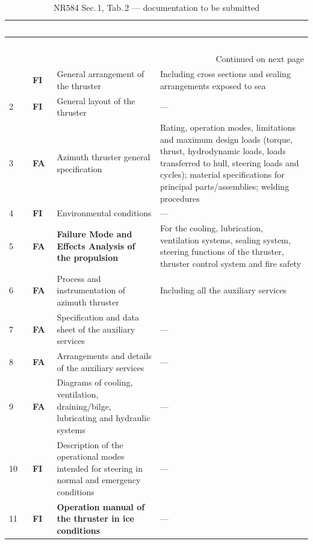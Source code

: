 \documentclass[11pt,a4paper]{report}
\newcommand{\fa}{\textbf{\textcolor{warningred}{FA}}}
\newcommand{\fic}{\textbf{\textcolor{bvgray}{FI}}}
\begin{document}
\begin{longtable}{|p{0.7cm}|p{1.1cm}|p{6.0cm}|p{6.2cm}|}
\caption{NR584 Sec.\,1, Tab.\,2 --- documentation to be submitted} \label{tab:nr584t2} \\
\hline
\rowcolor{bvblue}
\textcolor{white}{\textbf{No.}} & \textcolor{white}{\textbf{A/I}} & \textcolor{white}{\textbf{Documentation}} & \textcolor{white}{\textbf{Particulars}} \\
\hline
\endfirsthead
\hline
\rowcolor{bvblue}
\textcolor{white}{\textbf{No.}} & \textcolor{white}{\textbf{A/I}} & \textcolor{white}{\textbf{Documentation}} & \textcolor{white}{\textbf{Particulars}} \\
\hline
\endhead
\hline \multicolumn{4}{|r|}{{Continued on next page}} \\ \hline
\endfoot
\hline
\endlastfoot
1 & \fic{} & General arrangement of the thruster & Including cross sections and sealing arrangements exposed to sea \\
\hline
2 & \fic{} & General layout of the thruster & --- \\
\hline
3 & \fa{} & Azimuth thruster general specification & Rating, operation modes, limitations and maximum design loads (torque, thrust, hydrodynamic loads, loads transferred to hull, steering loads and cycles); material specifications for principal parts/assemblies; welding procedures \\
\hline
4 & \fic{} & Environmental conditions & --- \\
\hline
5 & \fa{} & \textbf{Failure Mode and Effects Analysis of the propulsion} & For the cooling, lubrication, ventilation systems, sealing system, steering functions of the thruster, thruster control system and fire safety \\
\hline
6 & \fa{} & Process and instrumentation of azimuth thruster & Including all the auxiliary services \\
\hline
7 & \fa{} & Specification and data sheet of the auxiliary services & --- \\
\hline
8 & \fa{} & Arrangements and details of the auxiliary services & --- \\
\hline
9 & \fa{} & Diagrams of cooling, ventilation, draining/bilge, lubricating and hydraulic systems & --- \\
\hline
10 & \fic{} & Description of the operational modes intended for steering in normal and emergency conditions & --- \\
\hline
11 & \fic{} & \textbf{Operation manual of the thruster in ice conditions} & --- \\

\end{longtable}
\end{document}
